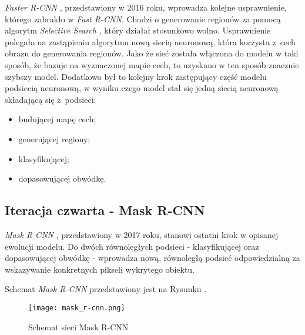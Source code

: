 
\textit{Faster R-CNN} \cite{faster-rcnn}, przedstawiony w 2016 roku, wprowadza kolejne usprawnienie, którego zabrakło w \textit{Fast R-CNN}.
Chodzi o generowanie regionów za pomocą algorytm \textit{Selective Search} \cite{selective-search}, który działał stosunkowo wolno.
Usprawnienie polegało na zastąpieniu algorytmu nową siecią neuronową, która korzysta z~cech obrazu do generowania regionów.
Jako że sieć została włączona do modelu w taki sposób, że bazuje na wyznaczonej mapie cech, to uzyskano w ten sposób znacznie szybszy model.
Dodatkowo był to kolejny krok zastępujący część modelu podsiecią neuronową, w wyniku czego model stał się jedną siecią neuronową składającą się z~podsieci:

\begin{itemize}
	\item budującej mapę cech;
	\item generującej regiony;
	\item klasyfikującej;
	\item dopasowującej obwódkę.
\end{itemize}

\newpage
\subsection{Iteracja czwarta - Mask R-CNN}

\textit{Mask R-CNN} \cite{matterport-mask-rcnn}, przedstawiony w 2017 roku, stanowi ostatni krok w opisanej ewolucji modelu.
Do dwóch równoległych podsieci - klasyfikującej oraz dopasowującej obwódkę - wprowadza nową, równoległą podsieć odpowiedzialną za wskazywanie konkretnych pikseli wykrytego obiektu.

Schemat \textit{Mask R-CNN} przedstawiony jest na Rysunku .


\begin{figure}[h]
  \centering
  \caption{Schemat sieci Mask R-CNN}
  \texttt{[image: mask\_r-cnn.png]}
  \label{fig:mask_r_cnn}
\end{figure}
